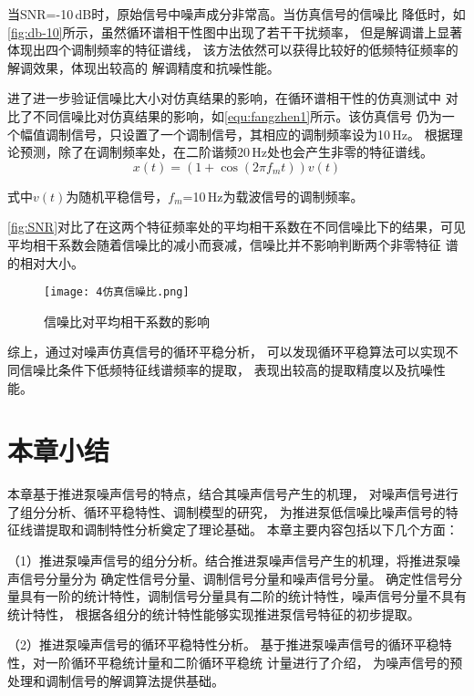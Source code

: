 当SNR=-10\,dB时，原始信号中噪声成分非常高。当仿真信号的信噪比
降低时，如\autoref{fig:db-10}所示，虽然循环谱相干性图中出现了若干干扰频率，
但是解调谱上显著体现出四个调制频率的特征谱线，
该方法依然可以获得比较好的低频特征频率的解调效果，体现出较高的
解调精度和抗噪性能。

进了进一步验证信噪比大小对仿真结果的影响，在循环谱相干性的仿真测试中
对比了不同信噪比对仿真结果的影响，如\autoref{equ:fangzhen1}所示。该仿真信号
仍为一个幅值调制信号，只设置了一个调制信号，其相应的调制频率设为10\,Hz。
根据理论预测，除了在调制频率处，在二阶谐频20\,Hz处也会产生非零的特征谱线。
\begin{equation}
    \label{equ:fangzhen1}
    x\left ( t \right ) =\left ( 1+\cos \left ( 2\pi f_mt \right )  \right ) v\left ( t \right ) 
\end{equation}

式中$v\left ( t \right )$为随机平稳信号，$f_m$=10\,Hz为载波信号的调制频率。

\autoref{fig:SNR}对比了在这两个特征频率处的平均相干系数在不同信噪比下的结果，可见
平均相干系数会随着信噪比的减小而衰减，信噪比并不影响判断两个非零特征
谱的相对大小。

\begin{figure}[htbp]
    \centering
    \texttt{[image: 4仿真信噪比.png]}
    \caption{\label{fig:SNR}信噪比对平均相干系数的影响
    }
\end{figure}

综上，通过对噪声仿真信号的循环平稳分析，
可以发现循环平稳算法可以实现不同信噪比条件下低频特征线谱频率的提取，
表现出较高的提取精度以及抗噪性能。
\section{本章小结}
本章基于推进泵噪声信号的特点，结合其噪声信号产生的机理，
对噪声信号进行了组分分析、循环平稳特性、调制模型的研究，
为推进泵低信噪比噪声信号的特征线谱提取和调制特性分析奠定了理论基础。
本章主要内容包括以下几个方面：

（1）推进泵噪声信号的组分分析。结合推进泵噪声信号产生的机理，将推进泵噪声信号分量分为
确定性信号分量、调制信号分量和噪声信号分量。
确定性信号分量具有一阶的统计特性，调制信号分量具有二阶的统计特性，噪声信号分量不具有统计特性，
根据各组分的统计特性能够实现推进泵信号特征的初步提取。 

（2）推进泵噪声信号的循环平稳特性分析。
基于推进泵噪声信号的循环平稳特性，对一阶循环平稳统计量和二阶循环平稳统
计量进行了介绍，
为噪声信号的预处理和调制信号的解调算法提供基础。

